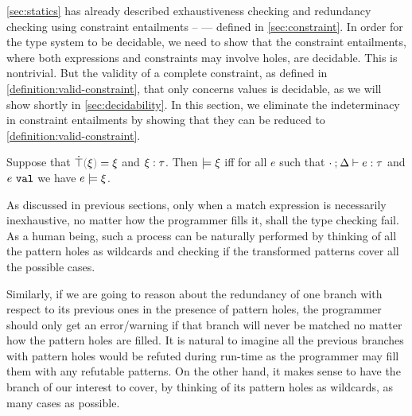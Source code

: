 \autoref{sec:statics} has already described exhaustiveness checking and redundancy checking using constraint entailments --  --- defined in \autoref{sec:constraint}. In order for the type system to be decidable, we need to show that the constraint entailments, where both expressions and constraints may involve holes, are decidable. This is nontrivial. But the validity of a complete constraint, as defined in \autoref{definition:valid-constraint}, that only concerns values is decidable, as we will show shortly in \autoref{sec:decidability}.
%
In this section, we eliminate the indeterminacy in constraint entailments by showing that they can be reduced to \autoref{definition:valid-constraint}. 

\begin{definition}
  \label{definition:valid-constraint}
  Suppose that $\ctruify{\xi}=\xi$ and $\xi : \tau$.
  Then $\models \xi$ iff for all $e$ such that $\cdot \mathbin{;} \Delta \vdash e : \tau$ and $e ~\mathtt{val}$ we have $e \models \xi$.
\end{definition}


As discussed in previous sections, only when a match expression is necessarily inexhaustive, no matter how the programmer fills it, shall the type checking fail. As a human being, such a process can be naturally performed by thinking of all the pattern holes as wildcards and checking if the transformed patterns cover all the possible cases. 

Similarly, if we are going to reason about the redundancy of one branch with respect to its previous ones in the presence of pattern holes, the programmer should only get an error/warning if that branch will never be matched no matter how the pattern holes are filled. It is natural to imagine all the previous branches with pattern holes would be refuted during run-time as the programmer may fill them with any refutable patterns. On the other hand, it makes sense to have the branch of our interest to cover, by thinking of its pattern holes as wildcards, as many cases as possible.%


